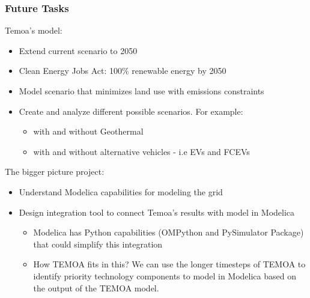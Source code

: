 \begin{frame}
\frametitle{Future Tasks}
	Temoa's model:
	\begin{itemize}
		\item Extend current scenario to 2050
		\item Clean Energy Jobs Act: 100\% renewable energy by 2050
		\item Model scenario that minimizes land use with emissions constraints
		\item Create and analyze different possible scenarios. For example:
			\begin{itemize}
				\item with and without Geothermal
				\item with and without alternative vehicles - i.e EVs and FCEVs
			\end{itemize}
	\end{itemize}	

    The bigger picture project:
	\begin{itemize}
		\item Understand Modelica capabilities for modeling the grid
		\item Design integration tool to connect Temoa's results with model in Modelica
		\begin{itemize}
			\item Modelica has Python capabilities (OMPython and PySimulator Package) that could simplify this integration
			\item How TEMOA fits in this? We can use the longer timesteps of TEMOA to identify priority technology components to model in Modelica based on the output of the TEMOA model.
		\end{itemize}
	\end{itemize}
\end{frame}
